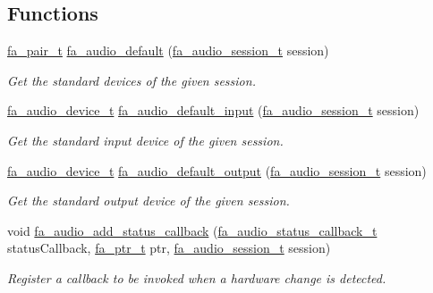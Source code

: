 \subsection*{Functions}
\begin{DoxyCompactItemize}
\item 
\hyperlink{group___fa_pair_gac2b2e58c230bac4f8a63ef6c05072680}{fa\-\_\-pair\-\_\-t} \hyperlink{group___fa_audio_device_gab51159ac7fd84af31a985e96f4f9c20f}{fa\-\_\-audio\-\_\-default} (\hyperlink{group___fa_audio_session_ga62ee22268c23f1b18447141feccc01e0}{fa\-\_\-audio\-\_\-session\-\_\-t} session)
\begin{DoxyCompactList}\small\item\em Get the standard devices of the given session. \end{DoxyCompactList}\item 
\hyperlink{group___fa_audio_device_ga03de89ee66c6465f8cedd3a0286598f4}{fa\-\_\-audio\-\_\-device\-\_\-t} \hyperlink{group___fa_audio_device_ga690374b4ffcee314cb4cdad6309ef817}{fa\-\_\-audio\-\_\-default\-\_\-input} (\hyperlink{group___fa_audio_session_ga62ee22268c23f1b18447141feccc01e0}{fa\-\_\-audio\-\_\-session\-\_\-t} session)
\begin{DoxyCompactList}\small\item\em Get the standard input device of the given session. \end{DoxyCompactList}\item 
\hyperlink{group___fa_audio_device_ga03de89ee66c6465f8cedd3a0286598f4}{fa\-\_\-audio\-\_\-device\-\_\-t} \hyperlink{group___fa_audio_device_ga364583565c9405e541ae52e41efa38e7}{fa\-\_\-audio\-\_\-default\-\_\-output} (\hyperlink{group___fa_audio_session_ga62ee22268c23f1b18447141feccc01e0}{fa\-\_\-audio\-\_\-session\-\_\-t} session)
\begin{DoxyCompactList}\small\item\em Get the standard output device of the given session. \end{DoxyCompactList}\item 
void \hyperlink{group___fa_audio_device_ga53538690e8c1eeebb470b99306fe289d}{fa\-\_\-audio\-\_\-add\-\_\-status\-\_\-callback} (\hyperlink{group___fa_audio_session_gaac3fa018078a475e6c5ed48efcbdb887}{fa\-\_\-audio\-\_\-status\-\_\-callback\-\_\-t} status\-Callback, \hyperlink{group___fa_ga915ddeae99ad7568b273d2b876425197}{fa\-\_\-ptr\-\_\-t} ptr, \hyperlink{group___fa_audio_session_ga62ee22268c23f1b18447141feccc01e0}{fa\-\_\-audio\-\_\-session\-\_\-t} session)
\begin{DoxyCompactList}\small\item\em Register a callback to be invoked when a hardware change is detected. \end{DoxyCompactList}\item 

\end{DoxyCompactItemize}
